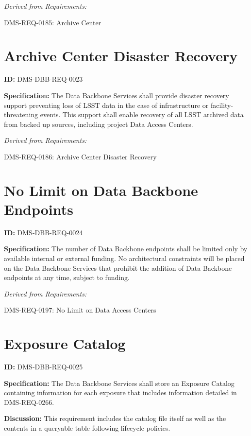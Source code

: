 \documentclass[SE,toc,lsstdraft]{lsstdoc}
\begin{document}
\emph{Derived from Requirements:}

DMS-REQ-0185:
Archive Center \newline

\section{Archive Center Disaster Recovery}

\label{DMS-DBB-REQ-0023}
\textbf{ID:} DMS-DBB-REQ-0023

\textbf{Specification:}
The Data Backbone Services shall provide disaster recovery support preventing loss of LSST data in the case of infrastructure or facility-threatening events. This support shall enable recovery of all LSST archived data from backed up sources, including project Data Access Centers.

\emph{Derived from Requirements:}

DMS-REQ-0186:
Archive Center Disaster Recovery \newline

\section{No Limit on Data Backbone Endpoints}

\label{DMS-DBB-REQ-0024}
\textbf{ID:} DMS-DBB-REQ-0024

\textbf{Specification:}
The number of Data Backbone endpoints shall be limited only by available internal or external funding. No architectural constraints will be placed on the Data Backbone Services that prohibit the addition of Data Backbone endpoints at any time, subject to funding.

\emph{Derived from Requirements:}

DMS-REQ-0197:
No Limit on Data Access Centers \newline

\section{Exposure Catalog}

\label{DMS-DBB-REQ-0025}
\textbf{ID:} DMS-DBB-REQ-0025

\textbf{Specification:}
The Data Backbone Services shall store an Exposure Catalog containing information for each exposure that includes information detailed in DMS-REQ-0266.

\textbf{Discussion:}
This requirement includes the catalog file itself as well as the contents in a queryable table following lifecycle policies.
\end{document}
